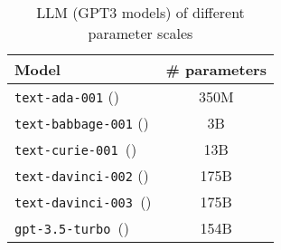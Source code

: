 \begin{table}[]
    \centering
    \begin{tabular}{|l|c|}
    \hline
        \textbf{Model} & \textbf{\# parameters}  \\\hline
         \texttt{text-ada-001} (\ada{}) &  350M \\
          \texttt{text-babbage-001} (\babbage{})  & 3B\\
          \texttt{text-curie-001 }(\curie{}) & 13B \\
         \texttt{text-davinci-002} (\davinci{}) & 175B \\
         \texttt{text-davinci-003 }(\vinci{})  & 175B \\
         \texttt{gpt-3.5-turbo }(\chatgpt{})  & 154B \\
          

  \hline
    \end{tabular}
    \caption{LLM (GPT3 models) of different parameter scales}
    \label{tab:gpt3_scales}
\end{table}